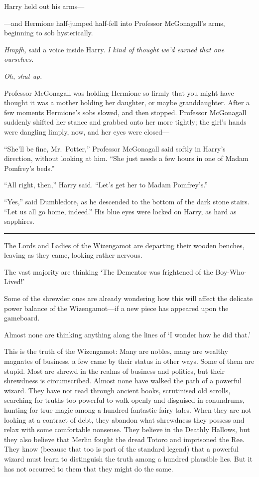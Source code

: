 Harry held out his arms---

---and Hermione half-jumped half-fell into Professor McGonagall's arms,
beginning to sob hysterically.

\emph{Hmpfh,} said a voice inside Harry. \emph{I kind of thought we'd
earned that one ourselves.}

\emph{Oh, shut up.}

Professor McGonagall was holding Hermione so firmly that you might have
thought it was a mother holding her daughter, or maybe granddaughter.
After a few moments Hermione's sobs slowed, and then stopped. Professor
McGonagall suddenly shifted her stance and grabbed onto her more
tightly; the girl's hands were dangling limply, now, and her eyes were
closed---

``She'll be fine, Mr.~Potter,'' Professor McGonagall said softly in
Harry's direction, without looking at him. ``She just needs a few hours
in one of Madam Pomfrey's beds.''

``All right, then,'' Harry said. ``Let's get her to Madam Pomfrey's.''

``Yes,'' said Dumbledore, as he descended to the bottom of the dark
stone stairs. ``Let us all go home, indeed.'' His blue eyes were locked
on Harry, as hard as sapphires.

\begin{center}\rule{3in}{0.4pt}\end{center}

The Lords and Ladies of the Wizengamot are departing their wooden
benches, leaving as they came, looking rather nervous.

The vast majority are thinking `The Dementor was frightened of the
Boy-Who-Lived!'

Some of the shrewder ones are already wondering how this will affect the
delicate power balance of the Wizengamot---if a new piece has appeared
upon the gameboard.

Almost none are thinking anything along the lines of `I wonder how he
did that.'

This is the truth of the Wizengamot: Many are nobles, many are wealthy
magnates of business, a few came by their status in other ways. Some of
them are stupid. Most are shrewd in the realms of business and politics,
but their shrewdness is circumscribed. Almost none have walked the path
of a powerful wizard. They have not read through ancient books,
scrutinised old scrolls, searching for truths too powerful to walk
openly and disguised in conundrums, hunting for true magic among a
hundred fantastic fairy tales. When they are not looking at a contract
of debt, they abandon what shrewdness they possess and relax with some
comfortable nonsense. They believe in the Deathly Hallows, but they also
believe that Merlin fought the dread Totoro and imprisoned the Ree. They
know (because that too is part of the standard legend) that a powerful
wizard must learn to distinguish the truth among a hundred plausible
lies. But it has not occurred to them that they might do the same.

